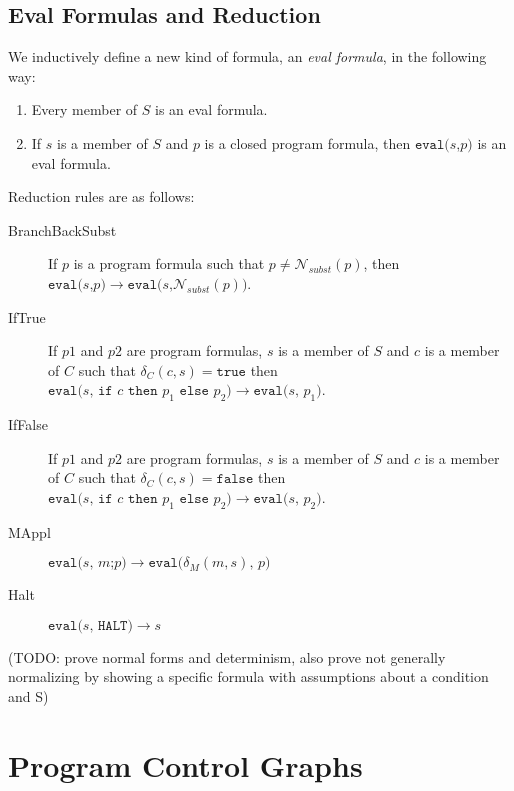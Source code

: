 \documentclass[11pt]{article}
\begin{document}
\subsection{Eval Formulas and Reduction}

We inductively define a new kind of formula, an \emph{eval formula}, in the following way:

\begin{enumerate}
\item Every member of $S$ is an eval formula.
\item If $s$ is a member of $S$ and $p$ is a closed program formula, then $\texttt{eval(}s\texttt{,} p\texttt{)}$ is an eval formula.
\end{enumerate}

Reduction rules are as follows:

\begin{description}
\item[BranchBackSubst] If $p$ is a program formula such that $p \neq \mathcal{N}_{subst}(p)$, then $\texttt{eval(}s\texttt{,} p\texttt{)} \longrightarrow \texttt{eval(}s\texttt{,} \mathcal{N}_{subst}(p)\texttt{)}$.
\item[IfTrue] If $p1$ and $p2$ are program formulas, $s$ is a member of $S$ and $c$ is a member of $C$ such that $\delta_{C}(c, s) = \texttt{true}$ then \\ $\texttt{eval(} s \texttt{, } \texttt{if } c \texttt{ then } p_{1} \texttt{ else } p_{2} \texttt{)} \longrightarrow \texttt{eval(} s \texttt{, } p_{1} \texttt{)}$.
\item[IfFalse] If $p1$ and $p2$ are program formulas, $s$ is a member of $S$ and $c$ is a member of $C$ such that $\delta_{C}(c, s) = \texttt{false}$ then \\ $\texttt{eval(} s \texttt{, } \texttt{if } c \texttt{ then } p_{1} \texttt{ else } p_{2} \texttt{)} \longrightarrow \texttt{eval(} s \texttt{, } p_{2} \texttt{)}$.
\item[MAppl] $\texttt{eval(}s\texttt{, } m\texttt{;}p \texttt{)} \longrightarrow \texttt{eval(} \delta_{M}(m, s)\texttt{, } p \texttt{)}$
\item[Halt] $\texttt{eval(}s\texttt{, } \texttt{HALT)} \longrightarrow s$
\end{description}


(TODO: prove normal forms and determinism, also prove not generally normalizing by showing a specific formula with assumptions about a condition and S)

\section{Program Control Graphs}
\end{document}
